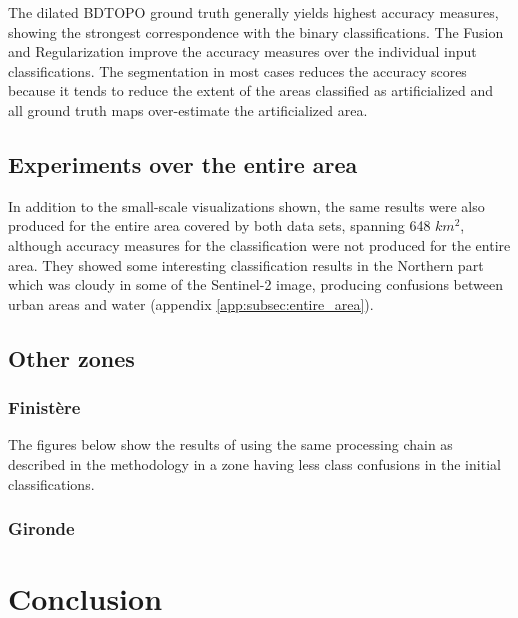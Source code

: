 \documentclass[10pt]{article}
\newcommand{\tile}{41000_30000}
\newcommand{\region}{finistere}
\begin{document}
The dilated BDTOPO ground truth generally yields highest accuracy measures, showing the strongest correspondence with the binary classifications. The Fusion and Regularization improve the accuracy measures over the individual input classifications. The segmentation in most cases reduces the accuracy scores because it tends to reduce the extent of the areas classified as artificialized and all ground truth maps over-estimate the artificialized area.

\subsection{Experiments over the entire area}
In addition to the small-scale visualizations shown, the same results were also produced for the entire area covered by both data sets, spanning 648 $km^2$, although accuracy measures for the classification were not produced for the entire area. They showed some interesting classification results in the Northern part which was cloudy in some of the Sentinel-2 image, producing confusions between urban areas and water (appendix \ref{app:subsec:entire_area}).

\subsection{Other zones}\label{subsec:otherZones}

\subsubsection{Finistère}
The figures below show the results of using the same processing chain as described in the methodology in a zone having less class confusions in the initial classifications.

\renewcommand{\tile}{35000_40000}
\figureTile
\figureGT
\figureOrigClass
\figureFusionRegul
\figureBinRegulSeg

\subsubsection{Gironde}
\renewcommand{\region}{gironde}
\renewcommand{\tile}{10500_34500}
\figureTile
\figureGT
\figureOrigClass
\figureFusionRegul
\figureBinRegulSeg

\renewcommand{\region}{finistere}
\renewcommand{\tile}{41000_30000}
\newpage
\section{Conclusion}
\end{document}
